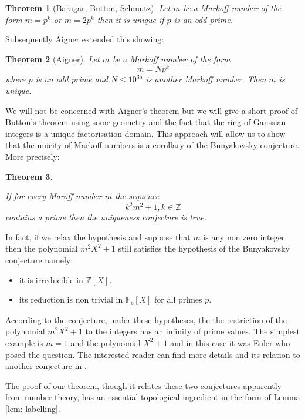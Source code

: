 \documentclass[12pt,a4paper]{amsart}
\newtheorem{thm}{Theorem}[section]
\def\ZZ{\mathbb{Z}}
\begin{document}
 \begin{thm}[Baragar, Button, Schmutz] \label{button}
 Let $m$ be a Markoff number of the form 
 $m=p^k$ or $m=2p^k$ then it is unique
if $p$ is an odd prime.
 \end{thm}


Subsequently Aigner extended  this showing:
 
 \begin{thm}[Aigner]
 Let $m$ be a Markoff number of the form 
 $$m =Np^k$$
 where $p$ is an odd prime and $N \leq 10^{35}$ is another Markoff number. Then $m$ is unique.
 \end{thm}

We will not be concerned with Aigner's theorem but we will give a short proof
of Button's theorem using some geometry and the fact that the ring of Gaussian
integers is a unique factorisation domain. This approach will allow us to show
that the unicity of Markoff numbers is a corollary of the Bunyakovsky
conjecture. More precisely:

\begin{thm}\label{main}

If for every Maroff number $m$ the sequence $$k^2m^2 + 1, k \in \ZZ$$ contains a
prime then the uniqueness conjecture is true.

\end{thm}


In fact, if we relax the hypothesis and suppose that $m$ is any non zero
integer then the polynomial $m^2 X^2 + 1$ still satisfies the hypothesis of the
Bunyakovsky conjecture namely:

\begin{itemize}
\item it is irreducible in  $\ZZ[X]$.
\item its reduction is non trivial in $\mathbb{F}_p[X]$ for all primes $p$.
\end{itemize}

\noindent
According to the conjecture, under these hypotheses, the the restriction of the
polynomial  $m^2 X^2 + 1$ to the integers has an infinity of prime values. The
simplest example is $m=1$ and the polynomial $X^2 + 1$ and in this case it was
Euler who posed the question. The interested reader can find more details and
its relation to another conjecture in \cite{Pollack}.

The proof of our theorem, though it relates these two conjectures apparently from
number theory, has an essential topological ingredient in the form of Lemma
\ref{lem: labelling}.
\end{document}
